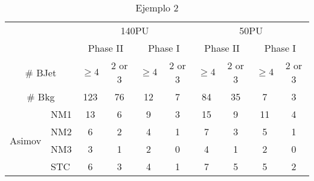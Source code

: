 \begin{table}[ht]
\centering
\begin{tabular}{l|l|c|c|c|c||c|c|c|c} %
\cmidrule[1pt]{3-10}                  %
\multicolumn{2}{c|}{}&\multicolumn{4}{c||}{140PU}&\multicolumn{4}{c}{50PU} \\\cmidrule{3-10}
\multicolumn{2}{c|}{}&\multicolumn{2}{c|}{Phase II}&\multicolumn{2}{c||}{Phase I}&\multicolumn{2}{c|}{Phase II}&\multicolumn{2}{c}{Phase I}\\\midrule
\multicolumn{2}{c|}{\# BJet}&$ \geq 4 $ & 2 or 3 &$ \geq 4 $ & 2 or 3&$ \geq 4 $ & 2 or 3 &$ \geq 4 $ & 2 or 3 \\\midrule
\multicolumn{2}{c|}{\# Bkg} & 123 & 76 & 12 & 7 & 84 & 35 & 7 & 3 \\\midrule\midrule
\multirow{4}{3mm}{\begin{sideways}\parbox{15mm}{Asimov}\end{sideways}}
& NM1 & 13 & 6 & 9 & 3 & 15 & 9 & 11 & 4 \\
& NM2 & 6 & 2 & 4 & 1 & 7 & 3 & 5 & 1 \\
& NM3 & 3 & 1 & 2 & 0 & 4 & 1 & 2 & 0 \\
& STC & 6 & 3 & 4 & 1 & 7 & 5 & 5 & 2 \\\midrule
\end{tabular}
\caption{Ejemplo 2}
\end{table}








